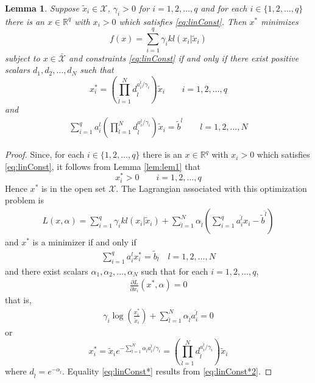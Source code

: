 \documentclass[twocolumn]{article}
\newtheorem{lemma}{Lemma}
\begin{document}
\begin{lemma}
\label{lem:lem2}
Suppose 
$\tilde{x}_i \in {\mathcal X}$, $\gamma_i >0$ for $i=1,2,\dots, q$ and 
 for each $i \in \{1,2, \dots, q\}$ there is an $x\in \mathbb{R}^q $ with   $x_i >0$  which satisfies  \eqref{eq:linConst}.
Then
$x^*$ minimizes 
\begin{equation*}
f(x)= \sum_{i=1}^q\gamma_i kl(x_i|\tilde{x}_i)
\end{equation*}
  subject to $x \in \bar{\mathcal X}$ and constraints \eqref{eq:linConst}
 if and only if 
 there exist positive  scalars $d_1,d_2, \dots, d_N$ 
such that
\begin{equation}
\label{eq:xstar}
x^*_i = \left(\prod_{ {\hat l}=1}^Nd_{\hat l}^{a^{\hat l}_{i}/\gamma_i} \right) \tilde{x}_i\qquad i=1,2, \dots, q
\end{equation}
and
\begin{align}
\label{eq:linConst*}
\sum_{i=1}^q a^l_i \left(\prod_{\hat{l}=1}^Nd_{\hat l}^{a^{\hat l}_i/\gamma_i} \right)\tilde{x}_i =\tilde{b}^l \qquad l=1,2,\dots, N
\end{align}

\end{lemma}




\begin{proof}
Since,  for each $i \in \{1,2, \dots, q\}$ there is an $x\in \mathbb{R}^q $ with   $x_i >0$
which satisfies \eqref{eq:linConst}, it follows from  Lemma \ref{lem:lem1} that
\[
x^*_i >0 \qquad i=1,2,\dots, q
\]
Hence $x^*$ is in the open set $ {\mathcal X}$.
The Lagrangian associated with this optimization  problem is
\begin{align*}
L(x, \alpha)  =    \sum_{i=1}^q  \gamma_i kl(x_i | \tilde{x}_i) 
+\sum_{\hat{l}=1}^N \alpha_{\hat{l}} \left(\sum_{i=1}^q a^{\hat{l}}_i x_i- \tilde{b}^{\hat l} \right)
\end{align*}
and $x^*$ is a minimizer if and only if
\begin{align}
\label{eq:linConst*2}
\sum_{i=1}^q a^l_ix^*_i= \tilde{b}_l \quad l=1, 2, \dots, N
\end{align}
and
 there exist scalars $\alpha_1,\alpha_2, \dots, \alpha_N$ such that for each $i=1,2,\dots, q$,
\begin{align*}
\frac{\partial L}{\partial x_i}(x^*, \alpha)  = 0
\end{align*}
that is,
\begin{align*}
\gamma_i \log \left( \frac{x^*_i}{\tilde{x}_i }  \right) +\sum_{{\hat l}=1}^N\alpha_{\hat l} a^{\hat l}_i =0
\end{align*}
or
\[
x^*_i = \tilde{x}_i e^{-\sum_{{\hat l}=1}^N\alpha_{\hat l} a^{\hat l}_i /\gamma_i} =
\left(\prod_{\hat{l}=1}^Nd_{\hat l}^{a^{\hat l}_i/\gamma_i} \right) \tilde{x}_i
\]
where
$
d_{\hat l}= e^{-\alpha_{\hat l}}.
$
Equality  \eqref{eq:linConst*} results from \eqref{eq:linConst*2}.

\end{proof}
\end{document}
